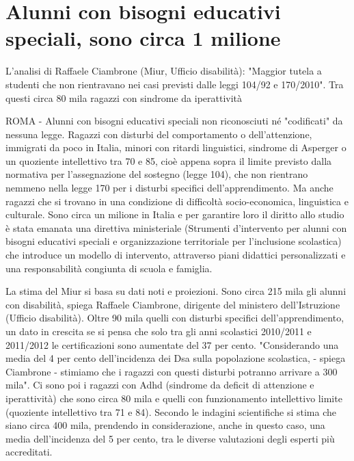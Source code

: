 \chapter{Alunni con bisogni educativi speciali, sono circa 1 milione}
\label{cha:ciambrone110613}
L'analisi di Raffaele Ciambrone (Miur, Ufficio disabilità): "Maggior tutela a studenti che non rientravano nei casi previsti dalle leggi 104/92 e 170/2010". Tra questi circa 80 mila ragazzi con sindrome da iperattività

ROMA - Alunni con bisogni educativi speciali non riconosciuti né "codificati" da nessuna legge. Ragazzi con disturbi del comportamento o dell'attenzione, immigrati da poco in Italia, minori con ritardi linguistici, sindrome di Asperger o un quoziente intellettivo tra 70 e 85, cioè appena sopra il limite previsto dalla normativa per l'assegnazione del sostegno (legge 104), che non rientrano nemmeno nella legge 170 per i disturbi specifici dell'apprendimento. Ma anche ragazzi che si trovano in una condizione di difficoltà socio-economica, linguistica e culturale. Sono circa un milione in Italia e per garantire loro il diritto allo studio è stata emanata una direttiva ministeriale (Strumenti d'intervento per alunni con bisogni educativi speciali e organizzazione territoriale per l'inclusione scolastica) che introduce un modello di intervento, attraverso piani didattici personalizzati e una responsabilità congiunta di scuola e famiglia.

La stima del Miur si basa su dati noti e proiezioni. Sono circa 215 mila gli alunni con disabilità, spiega Raffaele Ciambrone, dirigente del ministero dell'Istruzione (Ufficio disabilità). Oltre 90 mila quelli con disturbi specifici dell'apprendimento, un dato in crescita se si pensa che solo tra gli anni scolastici 2010/2011 e 2011/2012 le certificazioni sono aumentate del 37 per cento. "Considerando una media del 4 per cento dell'incidenza dei Dsa sulla popolazione scolastica, - spiega Ciambrone - stimiamo che i ragazzi con questi disturbi potranno arrivare a 300 mila". Ci sono poi i ragazzi con Adhd (sindrome da deficit di attenzione e iperattività) che sono circa 80 mila e quelli con funzionamento intellettivo limite (quoziente intellettivo tra 71 e 84). Secondo le indagini scientifiche si stima che siano circa 400 mila, prendendo in considerazione, anche in questo caso, una media dell'incidenza del 5 per cento, tra le diverse valutazioni degli esperti più accreditati.

